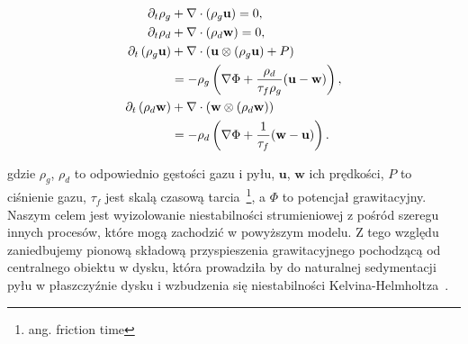 \begin{align}
\partial_t \rho_g &+ \nabla\cdot\left(\rho_g\mathbf{u}\right) = 0,\\
\partial_t \rho_d &+ \nabla\cdot\left(\rho_d\mathbf{w}\right) = 0,\\
\partial_t \left(\rho_g\mathbf{u}\right) &+
   \nabla\cdot(\mathbf{u}\otimes(\rho_g\mathbf{u})+P) \notag\\
 &= -\rho_g\left(\nabla\Phi +
\frac{\rho_d}{\tau_f\rho_g}(\mathbf{u}-\mathbf{w})\right),\label{eq3}\\
\partial_t \left(\rho_d\mathbf{w}\right) &+
\nabla\cdot(\mathbf{w}\otimes(\rho_d\mathbf{w})) \notag\\
 &= -\rho_d\left(\nabla\Phi + \frac{1}{\tau_f}(\mathbf{w}-\mathbf{u})\right)
\label{eq4}.
\end{align}

\noindent gdzie $\rho_g$, $\rho_d$ to odpowiednio gęstości gazu i pyłu,
$\mathbf{u}$, $\mathbf{w}$ ich prędkości, $P$ to ciśnienie gazu, $\tau_f$ jest
skalą czasową tarcia~\footnote{ang. friction time}, a $\Phi$ to potencjał
grawitacyjny. Naszym celem jest wyizolowanie niestabilności strumieniowej z
pośród szeregu innych procesów, które mogą zachodzić w powyższym modelu. Z tego
względu zaniedbujemy pionową składową przyspieszenia grawitacyjnego pochodzącą
od centralnego obiektu w dysku, która prowadziła by do naturalnej sedymentacji
pyłu w płaszczyźnie dysku i wzbudzenia się niestabilności
Kelvina-Helmholtza~\cite{JHK06}.

